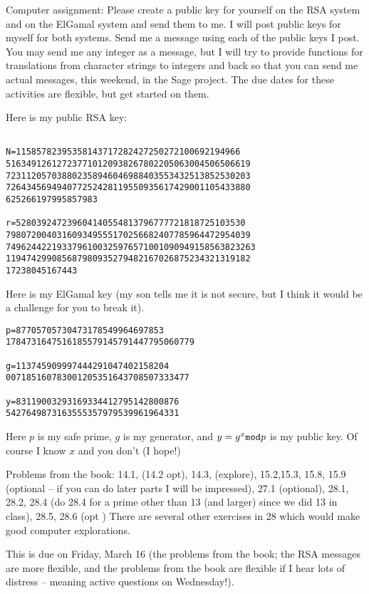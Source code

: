 \documentclass[12pt]{article}
\begin{document}
Computer assignment:  Please create a public key for yourself on the RSA system and on the ElGamal system and send them to me.  I will post public keys for myself for both systems.  Send me a message using each of the public keys I post.  You may send me any integer as a message, but I will try to provide functions for translations from character strings to integers and back so that you can send me actual messages, this weekend, in the Sage project.  The due dates for these activities are flexible, but get started on them.

Here is my public RSA key:

\begin{verbatim}

N=11585782395358143717282427250272100692194966
516349126127237710120938267802205063004506506619
723112057038802358946046988403553432513852530203
726434569494077252428119550935617429001105433880
625266197995857983

r=528039247239604140554813796777721818725103530
798072004031609349555170256682407785964472954039
7496244221933796100325976571001090949158563823263
119474299085687980935279482167026875234321319182
17238045167443

\end{verbatim}

Here is my ElGamal key (my son tells me it is not secure, but I think it would be a challenge for you to break it).

\begin{verbatim}
p=87705705730473178549964697853
1784731647516185579145791447795060779

g=113745909997444291047402158204
007185160783001205351643708507333477

y=83119003293169334412795142800876
5427649873163555357979539961964331
\end{verbatim}

Here $p$ is my safe prime, $g$ is my generator, and $y = g^x {\tt mod} p$ is my public key.  Of course I know $x$ and you don't (I hope!)



Problems from the book:  14.1, (14.2 opt), 14.3, (explore), 15.2,15.3, 15.8, 15.9 (optional -- if you can do later parts I will be impressed), 27.1 (optional), 28.1, 28.2, 28.4 (do 28.4 for a prime other than 13 (and larger) since we did 13 in class),  28.5,  28.6 (opt )  There are several other exercises in 28 which would make good computer explorations.

This is due on Friday, March 16 (the problems from the book; the RSA messages are more flexible, and the problems from the book are flexible if I hear lots of distress -- meaning active questions on Wednesday!).
\end{document}
